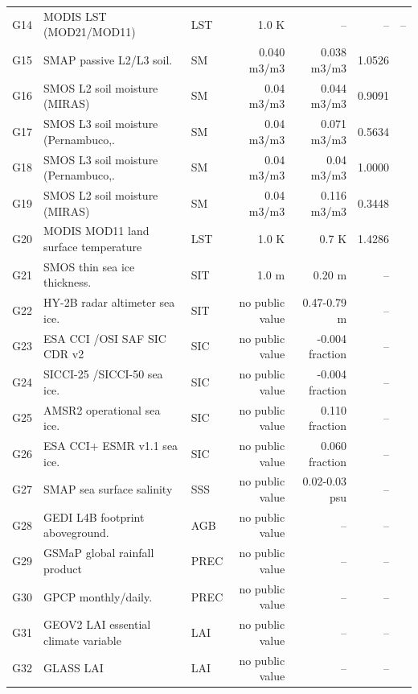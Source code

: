 \begin{longtable}{@{}l p{2.4cm} l r r r p{2.3cm}@{}}
G14 & MODIS LST (MOD21\slash MOD11) & LST & 1.0 K & -- & -- & -- \\
G15 & SMAP passive L2\slash L3 soil. & SM & 0.040 m3/m3 & 0.038 m3/m3 & 1.0526 & \citep{entekhabi2010,chan2016} \\
G16 & SMOS L2 soil moisture (MIRAS) & SM & 0.04 m3/m3 & 0.044 m3/m3 & 0.9091 & \citep{sanchez2012} \\
G17 & SMOS L3 soil moisture (Pernambuco,. & SM & 0.04 m3/m3 & 0.071 m3/m3 & 0.5634 & \citep{souza2018} \\
G18 & SMOS L3 soil moisture (Pernambuco,. & SM & 0.04 m3/m3 & 0.04 m3/m3 & 1.0000 & \citep{souza2018} \\
G19 & SMOS L2 soil moisture (MIRAS) & SM & 0.04 m3/m3 & 0.116 m3/m3 & 0.3448 & \citep{petropoulos2014} \\
G20 & MODIS MOD11 land surface temperature & LST & 1.0 K & 0.7 K & 1.4286 & \citep{wan2008,coll2009} \\
G21 & SMOS thin sea ice thickness. & SIT & 1.0 m & 0.20 m & -- & \citep{kaleschke2024} \\
G22 & HY-2B radar altimeter sea ice. & SIT & no public value & 0.47-0.79 m & -- & \citep{pang2024} \\
G23 & ESA CCI \slash  OSI SAF SIC CDR v2 & SIC & no public value & -0.004 fraction & -- & \citep{lavergne2019,kern2019} \\
G24 & SICCI-25 \slash  SICCI-50 sea ice. & SIC & no public value & -0.004 fraction & -- & \citep{lavergne2019,kern2019} \\
G25 & AMSR2 operational sea ice. & SIC & no public value & 0.110 fraction & -- & \citep{meier2017} \\
G26 & ESA CCI+ ESMR v1.1 sea ice. & SIC & no public value & 0.060 fraction & -- & \citep{kern2026} \\
G27 & SMAP sea surface salinity & SSS & no public value & 0.02-0.03 psu & -- & \citep{fournier2023} \\
G28 & GEDI L4B footprint aboveground. & AGB & no public value & -- & -- & \citep{kellner2023} \\
G29 & GSMaP global rainfall product & PREC & no public value & -- & -- & \citep{kubota2020} \\
G30 & GPCP monthly\slash daily. & PREC & no public value & -- & -- & \citep{huffman2023} \\
G31 & GEOV2 LAI essential climate variable & LAI & no public value & -- & -- & \citep{fang2021} \\
G32 & GLASS LAI & LAI & no public value & -- & -- & \citep{fang2019} \\

\end{longtable}
